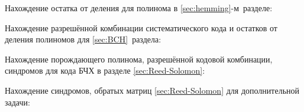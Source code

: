 \newpage
{} 
\label{sec:octave}

Нахождение остатка от деления для полинома в
\ref{sec:hemming}-м~разделе:  
\label{page1}


Нахождение разрешённой комбинации систематического кода и остатков от
деления полиномов для \ref{sec:BCH}~раздела:
\label{page2}
 

Нахождение порождающего полинома, разрешённой кодовой комбинации,
синдромов для кода БЧХ в разделе \ref{sec:Reed-Solomon}:
\label{page3}


Нахождение синдромов, обратых матриц \ref{sec:Reed-Solomon} для
дополнительной задачи:
\label{page4}

 \newpage



